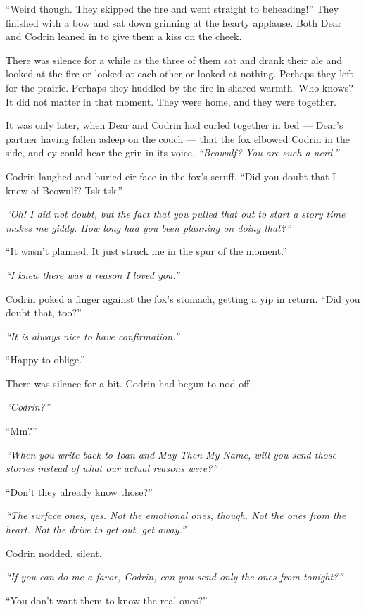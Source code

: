 ``Weird though. They skipped the fire and went straight to beheading!'' They finished with a bow and sat down grinning at the hearty applause. Both Dear and Codrin leaned in to give them a kiss on the cheek.

There was silence for a while as the three of them sat and drank their ale and looked at the fire or looked at each other or looked at nothing. Perhaps they left for the prairie. Perhaps they huddled by the fire in shared warmth. Who knows? It did not matter in that moment. They were home, and they were together.

It was only later, when Dear and Codrin had curled together in bed — Dear's partner having fallen asleep on the couch — that the fox elbowed Codrin in the side, and ey could hear the grin in its voice. \emph{``Beowulf? You are such a nerd.''}

Codrin laughed and buried eir face in the fox's scruff. ``Did you doubt that I knew of Beowulf? Tsk tsk.''

\emph{``Oh! I did not doubt, but the fact that you pulled that out to start a story time makes me giddy. How long had you been planning on doing that?''}

``It wasn't planned. It just struck me in the spur of the moment.''

\emph{``I knew there was a reason I loved you.''}

Codrin poked a finger against the fox's stomach, getting a yip in return. ``Did you doubt that, too?''

\emph{``It is always nice to have confirmation.''}

``Happy to oblige.''

There was silence for a bit. Codrin had begun to nod off.

\emph{``Codrin?''}

``Mm?''

\emph{``When you write back to Ioan and May Then My Name, will you send those stories instead of what our actual reasons were?''}

``Don't they already know those?''

\emph{``The surface ones, yes. Not the emotional ones, though. Not the ones from the heart. Not the drive to get out, get away.''}

Codrin nodded, silent.

\emph{``If you can do me a favor, Codrin, can you send only the ones from tonight?''}

``You don't want them to know the real ones?''

